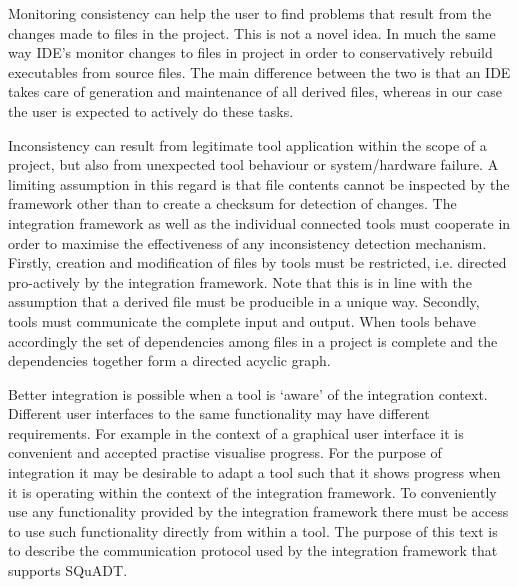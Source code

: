 \documentclass{article}
\newcommand{\squadt}{SQuADT\xspace}
\begin{document}
  Monitoring consistency can help the user to find problems that result from
  the changes made to files in the project. This is not a novel idea. In much
  the same way IDE's monitor changes to files in project in order to
  conservatively rebuild executables from source files. The main difference
  between the two is that an IDE takes care of generation and maintenance of
  all derived files, whereas in our case the user is expected to actively do
  these tasks.

  Inconsistency can result from legitimate tool application within the scope of
  a project, but also from unexpected tool behaviour or system/hardware
  failure. A limiting assumption in this regard is that file contents cannot be
  inspected by the framework other than to create a checksum for detection of
  changes.  The integration framework as well as the individual connected tools
  must cooperate in order to maximise the effectiveness of any inconsistency
  detection mechanism.  Firstly, creation and modification of files by tools
  must be restricted, i.e. directed pro-actively by the integration framework.
  Note that this is in line with the assumption that a derived file must be
  producible in a unique way. Secondly, tools must communicate the complete
  input and output.  When tools behave accordingly the set of dependencies
  among files in a project is complete and the dependencies together form a
  directed acyclic graph.
 
  Better integration is possible when a tool is `aware' of the integration
  context.  Different user interfaces to the same functionality may have
  different requirements. For example in the context of a graphical user
  interface it is convenient and accepted practise visualise progress. For the
  purpose of integration it may be desirable to adapt a tool such that it shows
  progress when it is operating within the context of the integration
  framework. To conveniently use any functionality provided by the integration
  framework there must be access to use such functionality directly from within
  a tool.  The purpose of this text is to describe the communication protocol
  used by the integration framework that supports \squadt.

\end{document}

